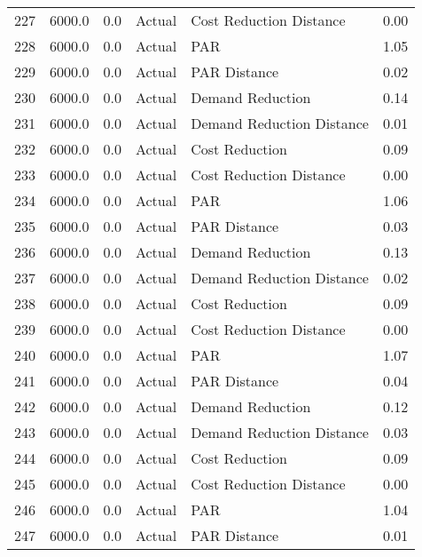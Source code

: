 \begin{longtable}{lrrllr}
227  &       6000.0 &     0.0 &         Actual &    Cost Reduction Distance &   0.00 \\
228  &       6000.0 &     0.0 &         Actual &                        PAR &   1.05 \\
229  &       6000.0 &     0.0 &         Actual &               PAR Distance &   0.02 \\
230  &       6000.0 &     0.0 &         Actual &           Demand Reduction &   0.14 \\
231  &       6000.0 &     0.0 &         Actual &  Demand Reduction Distance &   0.01 \\
232  &       6000.0 &     0.0 &         Actual &             Cost Reduction &   0.09 \\
233  &       6000.0 &     0.0 &         Actual &    Cost Reduction Distance &   0.00 \\
234  &       6000.0 &     0.0 &         Actual &                        PAR &   1.06 \\
235  &       6000.0 &     0.0 &         Actual &               PAR Distance &   0.03 \\
236  &       6000.0 &     0.0 &         Actual &           Demand Reduction &   0.13 \\
237  &       6000.0 &     0.0 &         Actual &  Demand Reduction Distance &   0.02 \\
238  &       6000.0 &     0.0 &         Actual &             Cost Reduction &   0.09 \\
239  &       6000.0 &     0.0 &         Actual &    Cost Reduction Distance &   0.00 \\
240  &       6000.0 &     0.0 &         Actual &                        PAR &   1.07 \\
241  &       6000.0 &     0.0 &         Actual &               PAR Distance &   0.04 \\
242  &       6000.0 &     0.0 &         Actual &           Demand Reduction &   0.12 \\
243  &       6000.0 &     0.0 &         Actual &  Demand Reduction Distance &   0.03 \\
244  &       6000.0 &     0.0 &         Actual &             Cost Reduction &   0.09 \\
245  &       6000.0 &     0.0 &         Actual &    Cost Reduction Distance &   0.00 \\
246  &       6000.0 &     0.0 &         Actual &                        PAR &   1.04 \\
247  &       6000.0 &     0.0 &         Actual &               PAR Distance &   0.01 \\

\end{longtable}
